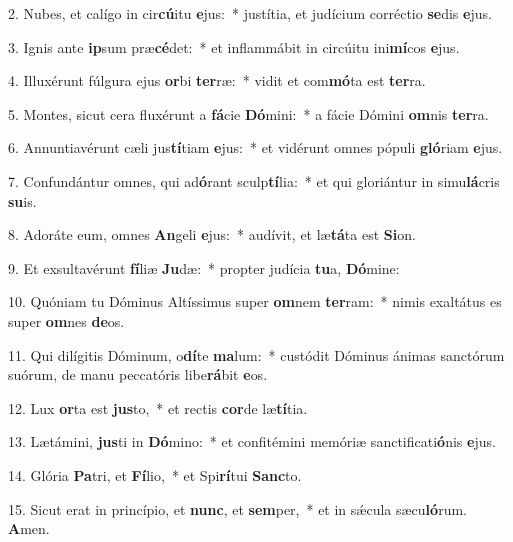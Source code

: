 2. Nubes, et calígo in cir\textbf{cú}itu \textbf{e}jus:~*  justítia, et judícium corréctio \textbf{se}dis \textbf{e}jus.\

3. Ignis ante \textbf{ip}sum præ\textbf{cé}det:~*  et inflammábit in circúitu ini\textbf{mí}cos \textbf{e}jus.\

4. Illuxérunt fúlgura ejus \textbf{or}bi \textbf{ter}ræ:~*  vidit et com\textbf{mó}ta est \textbf{ter}ra.\

5. Montes, sicut cera fluxérunt a \textbf{fá}cie \textbf{Dó}mini:~*  a fácie Dómini \textbf{om}nis \textbf{ter}ra.\

6. Annuntiavérunt cæli jus\textbf{tí}tiam \textbf{e}jus:~*  et vidérunt omnes pópuli \textbf{gló}riam \textbf{e}jus.\

7. Confundántur omnes, qui ad\textbf{ó}rant sculp\textbf{tí}lia:~*  et qui gloriántur in simu\textbf{lá}cris \textbf{su}is.\

8. Adoráte eum, omnes \textbf{An}geli \textbf{e}jus:~*  audívit, et læ\textbf{tá}ta est \textbf{Si}on.\

9. Et exsultavérunt \textbf{fí}liæ \textbf{Ju}dæ:~*  propter judícia \textbf{tu}a, \textbf{Dó}mine:\

10. Quóniam tu Dóminus Altíssimus super \textbf{om}nem \textbf{ter}ram:~*  nimis exaltátus es super \textbf{om}nes \textbf{de}os.\

11. Qui dilígitis Dóminum, o\textbf{dí}te \textbf{ma}lum:~*  custódit Dóminus ánimas sanctórum suórum, de manu peccatóris libe\textbf{rá}bit \textbf{e}os.\

12. Lux \textbf{or}ta est \textbf{jus}to,~*  et rectis \textbf{cor}de læ\textbf{tí}tia.\

13. Lætámini, \textbf{jus}ti in \textbf{Dó}mino:~*  et confitémini memóriæ sanctificati\textbf{ó}nis \textbf{e}jus.\

14. Glória \textbf{Pa}tri, et \textbf{Fí}lio,~*  et Spi\textbf{rí}tui \textbf{Sanc}to.\

15. Sicut erat in princípio, et \textbf{nunc}, et \textbf{sem}per,~*  et in sǽcula sæcu\textbf{ló}rum. \textbf{A}men.\

